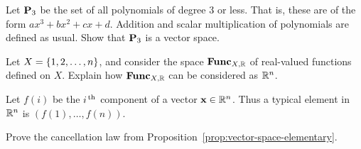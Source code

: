 \begin{ex}
  Let $\mathbf{P}_{3}$ be the set of all polynomials of degree 3 or
  less. That is, these are of the form $ax^3+bx^2+cx+d$. Addition and
  scalar multiplication of polynomials are defined as usual.  Show
  that $\mathbf{P}_{3}$ is a vector space.
\end{ex}

\begin{ex}
  Let $X=\left\{1,2,\ldots,n\right\}$, and consider the space $\mathbf{Func}_{X,\mathbb{R}}$ of
  real-valued functions defined on $X$. Explain how $\mathbf{Func}_{X,\mathbb{R}}$ can be
  considered as $\mathbb{R}^{n}$.
  \begin{sol}
    Let $f(i)$ be the $i^{\,\rm th}$ component of a vector
    $\mbox{\bf x}\in\mathbb{R}^{n}$. Thus a typical element in $\mathbb{R}^{n}$ is
    $ (f(1),\ldots,f(n))$.
  \end{sol}
\end{ex}

\begin{ex}
  Prove the cancellation law from
  Proposition~\ref{prop:vector-space-elementary}.
\end{ex}
